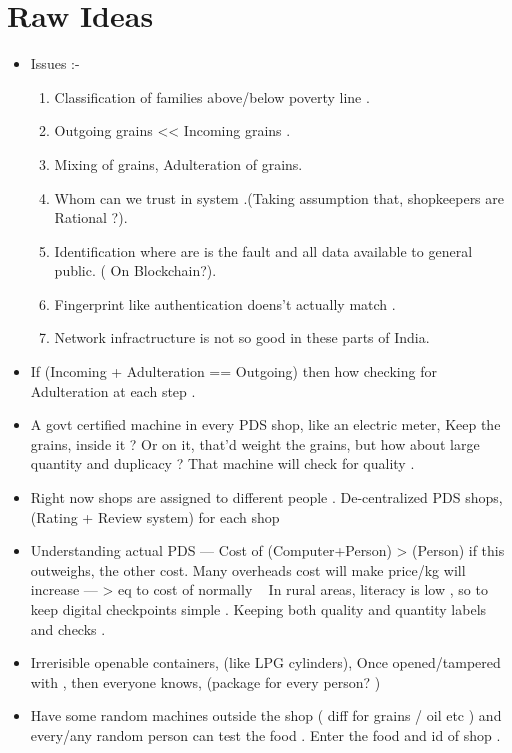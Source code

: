 \documentclass[12pt]{report}
\begin{document}
\section{Raw Ideas}
\begin{itemize}
  \item 
Issues :- 
\\
\begin{enumerate}
  \item 
  Classification of families above/below poverty line . 
  \item 
  Outgoing grains << Incoming grains . 
  \item 
  Mixing of grains, Adulteration of grains. 
  \item 
  Whom can we trust in system .(Taking assumption that, shopkeepers are Rational ?). 
  \item 
  Identification where are is the fault and all data available to general public. ( On Blockchain?). 
  \item 
  Fingerprint like authentication doens't actually match .
  \item
  Network infractructure is not so good in these parts of India.

\end{enumerate}
\item
If (Incoming + Adulteration == Outgoing) then how checking for Adulteration at each step .

\item
A govt certified machine in every PDS shop, like an electric meter, Keep the grains, inside it ? Or on it, that'd weight the grains, but how about large quantity and duplicacy ? 
That machine will check for quality .

\item
Right now shops are assigned to different people .
De-centralized PDS shops, (Rating + Review system) for each shop 

\item
Understanding actual PDS --- 
Cost of (Computer+Person) > (Person) if this outweighs, the other cost. 
Many overheads cost will make price/kg will increase --- > eq to cost of normally ~ 
In rural areas, literacy is low , so to keep digital checkpoints simple .
Keeping both quality and quantity labels and checks .

\item
Irrerisible openable containers, (like LPG cylinders), Once opened/tampered with , then everyone knows, (package for every person? )

\item
Have some random machines outside the shop ( diff for grains / oil etc ) and every/any random person can test the food . Enter the food and id of shop .


\end{itemize}
\end{document}
